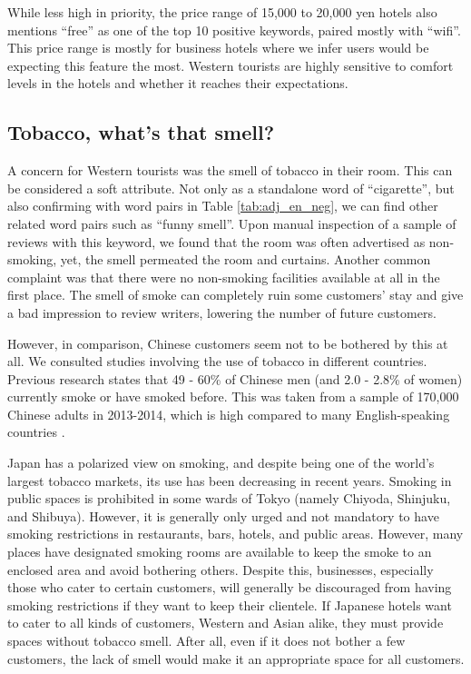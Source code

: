 \documentclass[smallextended,natbib]{svjour3}       %
\begin{document}
    While less high in priority, the price range of 15,000 to 20,000 yen hotels also mentions ``free'' as one of the top 10 positive keywords, paired mostly with ``wifi''. This price range is mostly for business hotels where we infer users would be expecting this feature the most. Western tourists are highly sensitive to comfort levels in the hotels and whether it reaches their expectations.


  \subsection{Tobacco, what's that smell?}\label{disc:tobacco}

    A concern for Western tourists was the smell of tobacco in their room. This can be considered a soft attribute. Not only as a standalone word of ``cigarette'', but also confirming with word pairs in Table \ref{tab:adj_en_neg}, we can find other related word pairs such as ``funny smell''. Upon manual inspection of a sample of reviews with this keyword, we found that the room was often advertised as non- smoking, yet, the smell permeated the room and curtains. Another common complaint was that there were no non-smoking facilities available at all in the first place. The smell of smoke can completely ruin some customers’ stay and give a bad impression to review writers, lowering the number of future customers.

    However, in comparison, Chinese customers seem not to be bothered by this at all. We consulted studies involving the use of tobacco in different countries. Previous research states that 49 - 60\% of Chinese men (and 2.0 - 2.8\% of women) currently smoke or have smoked before. This was taken from a sample of 170,000 Chinese adults in 2013-2014, which is high compared to many English-speaking countries \cite[][]{zhang2019tobacco,who2015tobacco}.

    Japan has a polarized view on smoking, and despite being one of the world’s largest tobacco markets, its use has been decreasing in recent years. Smoking in public spaces is prohibited in some wards of Tokyo (namely Chiyoda, Shinjuku, and Shibuya). However, it is generally only urged and not mandatory to have smoking restrictions in restaurants, bars, hotels, and public areas. However, many places have designated smoking rooms are available to keep the smoke to an enclosed area and avoid bothering others. Despite this, businesses, especially those who cater to certain customers, will generally be discouraged from having smoking restrictions if they want to keep their clientele. If Japanese hotels want to cater to all kinds of customers, Western and Asian alike, they must provide spaces without tobacco smell. After all, even if it does not bother a few customers, the lack of smell would make it an appropriate space for all customers.
\end{document}
